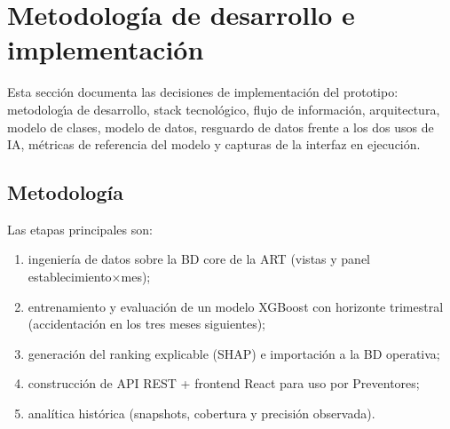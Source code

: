 \chapter{Metodolog\'ia de desarrollo e implementaci\'on}\label{ch:metodologia}

Esta secci\'on documenta las decisiones de implementaci\'on del prototipo: metodolog\'{\i}a de desarrollo, stack tecnol\'ogico, flujo de informaci\'on, arquitectura, modelo de clases, modelo de datos, resguardo de datos frente a los dos usos de IA, m\'etricas de referencia del modelo y capturas de la interfaz en ejecuci\'on.

\section{Metodolog\'ia}


Las etapas principales son:
\begin{enumerate}
	\item ingenier\'ia de datos sobre la BD core de la ART (vistas y panel establecimiento$\times$mes);
	\item entrenamiento y evaluaci\'on de un modelo XGBoost con horizonte trimestral (accidentaci\'on en los tres meses siguientes);
	\item generaci\'on del ranking explicable (SHAP) e importaci\'on a la BD operativa;
	\item construcci\'on de API REST + frontend React para uso por Preventores;
	\item anal\'itica hist\'orica (snapshots, cobertura y precisi\'on observada).
\end{enumerate}

